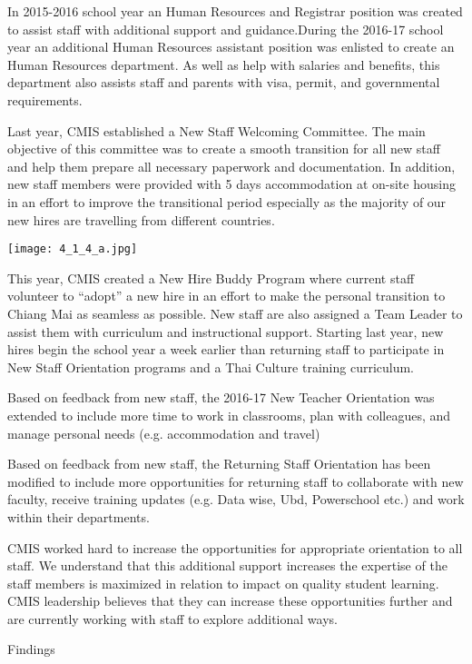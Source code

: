 \begin{findings}
In 2015-2016 school year an Human Resources and Registrar position was created to assist staff with additional support  and guidance.During the 2016-17 school year an additional Human Resources assistant position was enlisted to create an Human Resources department. As well as help with salaries and benefits, this department also assists staff and parents with visa, permit, and governmental requirements.

Last year, CMIS established a New Staff Welcoming Committee. The main objective of this committee  was to create a smooth transition for all new staff and help them prepare all necessary paperwork and documentation. In addition, new staff members were provided with 5 days accommodation at on-site housing in an effort to improve the transitional period especially as the majority of our new hires are travelling from different countries.

\texttt{[image: 4\_1\_4\_a.jpg]}

This year, CMIS created a New Hire Buddy Program where current staff volunteer to “adopt” a new hire in an effort to make the personal transition to Chiang Mai as seamless as possible. New staff  are also assigned a Team Leader to assist them with curriculum and instructional support. Starting last year, new hires begin the school year a week earlier than returning staff to participate in New Staff Orientation programs and a Thai Culture training curriculum.

Based on feedback from new staff, the 2016-17 New Teacher Orientation was extended to include more time to work in classrooms, plan with colleagues, and manage personal needs (e.g. accommodation and travel)

Based on feedback from new staff, the Returning Staff Orientation has been modified to include  more opportunities for returning staff to collaborate with new faculty, receive training updates (e.g. Data wise, Ubd, Powerschool etc.) and work within their departments.


CMIS worked hard to increase the opportunities for appropriate orientation to all staff. We understand that this additional support increases the expertise of the staff members is maximized in relation to impact on quality student learning. CMIS leadership believes that they can increase these opportunities further and are currently working with staff to explore additional ways.
\end{findings}Findings

